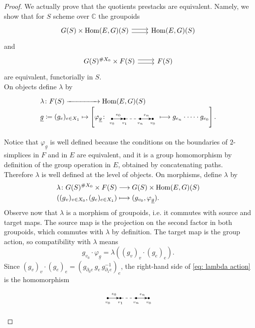 \begin{proof}
We actually prove that the quotients prestacks are equivalent. Namely, we show that for $S$ scheme over $\mathbb{C}$ the groupoids
\begin{equation}
\begin{tikzcd}
	{G(S) \times \Hom(E, G)(S)} & {\Hom(E, G)(S)}
	\arrow[shift right, from=1-1, to=1-2]
	\arrow[shift left, from=1-1, to=1-2]
\end{tikzcd}
\end{equation}
and
\begin{equation}
\begin{tikzcd}
	{G(S)^{\# X_0} \times F(S)} & {F(S)}
	\arrow[shift right, from=1-1, to=1-2]
	\arrow[shift left, from=1-1, to=1-2]
\end{tikzcd}
\end{equation}
are equivalent, functorially in $S$.\\
On objects define $\lambda$ by
\begin{equation}
\begin{tikzpicture}
  \node (L1) at (0,0) [anchor=west] {
    $\lambda \colon F(S) \xrightarrow{\hspace{1.5cm}} \Hom(E, G)(S)$
  };
  \node (L2) at (0,-0.8) [anchor=west] {
    $\underline{g}\coloneqq (g_e)_{e \in X_1} \mapsto \left[ 
      \varphi_{\underline{g}} \colon \graphfragment{} 
      \longmapsto g_{e_n} \cdot \dots \cdot g_{e_0} 
    \right].$
  };
\end{tikzpicture}
\end{equation}
Notice that $\varphi_{\underline{g}}$ is well defined because the conditions on the boundaries of $2$-simplices in $F$ and in $E$ are equivalent, and it is a group homomorphism by definition of the group operation in $E$, obtained by concatenating paths. Therefore $\lambda$ is well defined at the level of objects.
On morphisms, define $\lambda$ by
\begin{align}
\lambda \colon G(S)^{\# X_0} \times F(S) &\longrightarrow G(S) \times \operatorname{Hom}(E, G)(S) \\
  \left((g_v)_{v \in X_0}, (g_e)_{e \in X_1}\right) &\longmapsto (g_{v_0}, \varphi_{\underline{g}}).
\end{align}
Observe now that $\lambda$ is a morphism of groupoids, i.e. it commutes with source and target maps. The source map is the projection on the second factor in both groupoids, which commutes with $\lambda$ by definition. The target map is the group action, so compatibility with $\lambda$ means
\begin{equation} \label{eq: lambda action}
g_{v_0} \cdot \varphi_{\underline{g}} = \lambda\left((g_v)_v \cdot (g_e)_e \right).
\end{equation}
Since $(g_v)_v \cdot (g_e)_e = \left(g_{\partial_0 e} \, g_e \, g_{\partial_1 e}^{-1}\right)_e$, the right-hand side of \eqref{eq: lambda action} is the homomorphism
\begin{equation}
\begin{tikzpicture}[>=stealth, auto, node distance=1.2cm]
  \node (start_graph) {\graphfragment{}};
  

\end{tikzpicture}
\end{equation}
\end{proof}
